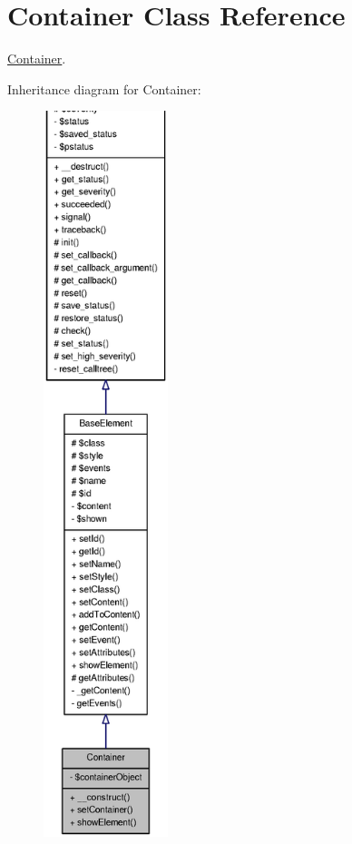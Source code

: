 \section{Container Class Reference}
\label{classContainer}


\hyperlink{classContainer}{Container}.  




Inheritance diagram for Container:\nopagebreak
\begin{figure}[H]
\begin{center}
\leavevmode
\includegraphics[height=600pt]{classContainer__inherit__graph}
\end{center}
\end{figure}


